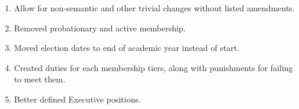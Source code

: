 
\begin{enumerate}
	\item Allow for non-semantic and other trivial changes without listed amendments.

	\item Removed probationary and active membership.

	\item Moved election dates to end of academic year instead of start.

	\item Created duties for each membership tiers, along with punishments for
		failing to meet them.

	\item Better defined Executive positions.
\end{enumerate}
